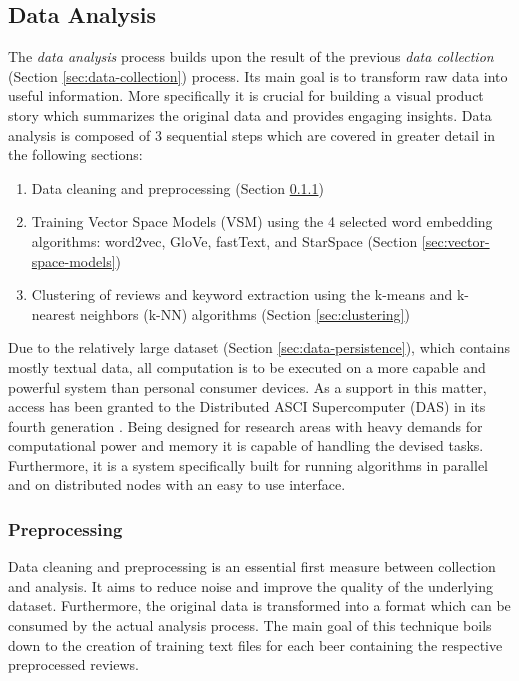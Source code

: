 \subsection{Data Analysis} \label{sec:data-analysis}
The \textit{data analysis} process builds upon the result of the previous \textit{data collection} (Section \ref{sec:data-collection}) process.
Its main goal is to transform raw data into useful information.
More specifically it is crucial for building a visual product story which summarizes the original data and provides engaging insights.
Data analysis is composed of 3 sequential steps which are covered in greater detail in the following sections:
\begin{enumerate}
	\item Data cleaning and preprocessing (Section \ref{sec:preprocessing})
	\item Training Vector Space Models (VSM) using the 4 selected word embedding algorithms: word2vec, GloVe, fastText, and StarSpace (Section \ref{sec:vector-space-models})
	\item Clustering of reviews and keyword extraction using the k-means \cite{Manning2009} and k-nearest neighbors (k-NN) \cite{Peterson2009} algorithms (Section \ref{sec:clustering})
\end{enumerate}

Due to the relatively large dataset (Section \ref{sec:data-persistence}), which contains mostly textual data, all computation is to be executed on a more capable and powerful system than personal consumer devices.
As a support in this matter, access has been granted to the Distributed ASCI Supercomputer (DAS) in its fourth generation \cite{Bal2016}.
Being designed for research areas with heavy demands for computational power and memory it is capable of handling the devised tasks.
Furthermore, it is a system specifically built for running algorithms in parallel and on distributed nodes with an easy to use interface.


\subsubsection{Preprocessing} \label{sec:preprocessing}
Data cleaning and preprocessing is an essential first measure between collection and analysis.
It aims to reduce noise and improve the quality of the underlying dataset.
Furthermore, the original data is transformed into a format which can be consumed by the actual analysis process.
The main goal of this technique boils down to the creation of training text files for each beer containing the respective preprocessed reviews.

